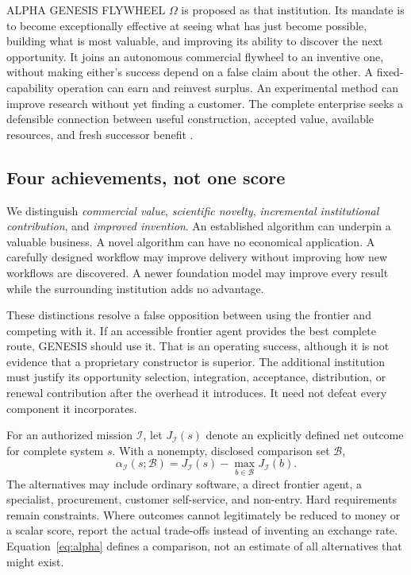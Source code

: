 \documentclass[11pt,letterpaper]{article}
\newcommand{\I}{\mathcal{I}}
\theoremstyle{remark}\newtheorem{remark}{Remark}[section]
\begin{document}
ALPHA GENESIS FLYWHEEL $\Omega$ is proposed as that institution. Its mandate is to become exceptionally effective at seeing what has just become possible, building what is most valuable, and improving its ability to discover the next opportunity. It joins an autonomous commercial flywheel to an inventive one, without making either's success depend on a false claim about the other. A fixed-capability operation can earn and reinvest surplus. An experimental method can improve research without yet finding a customer. The complete enterprise seeks a defensible connection between useful construction, accepted value, available resources, and fresh successor benefit \citep{boucher2026notes,boucher2026genesis}.

\subsection{Four achievements, not one score}
We distinguish \emph{commercial value}, \emph{scientific novelty}, \emph{incremental institutional contribution}, and \emph{improved invention}. An established algorithm can underpin a valuable business. A novel algorithm can have no economical application. A carefully designed workflow may improve delivery without improving how new workflows are discovered. A newer foundation model may improve every result while the surrounding institution adds no advantage.

These distinctions resolve a false opposition between using the frontier and competing with it. If an accessible frontier agent provides the best complete route, GENESIS should use it. That is an operating success, although it is not evidence that a proprietary constructor is superior. The additional institution must justify its opportunity selection, integration, acceptance, distribution, or renewal contribution after the overhead it introduces. It need not defeat every component it incorporates.

For an authorized mission $\I$, let $J_\I(s)$ denote an explicitly defined net outcome for complete system $s$. With a nonempty, disclosed comparison set $\mathcal B$,
\begin{equation}
\alpha_\I(s;\mathcal B)=J_\I(s)-\max_{b\in\mathcal B}J_\I(b).
\label{eq:alpha}
\end{equation}
The alternatives may include ordinary software, a direct frontier agent, a specialist, procurement, customer self-service, and non-entry. Hard requirements remain constraints. Where outcomes cannot legitimately be reduced to money or a scalar score, report the actual trade-offs instead of inventing an exchange rate. Equation~\eqref{eq:alpha} defines a comparison, not an estimate of all alternatives that might exist.
\end{document}
